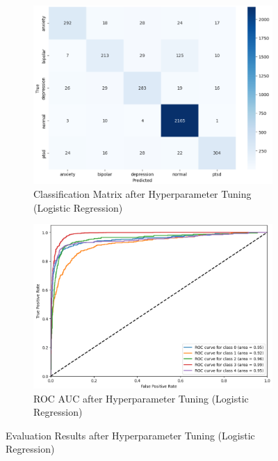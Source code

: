 \begin{figure}[h!]
    \centering
    \begin{subfigure}[b]{0.49\textwidth}
        \centering
        \includegraphics[width=\textwidth]{Images/HP LR CM.png}
        \caption{Classification Matrix after Hyperparameter Tuning (Logistic Regression)}
        \label{LSTMROC2}  %
    \end{subfigure}
    \hfill
    \begin{subfigure}[b]{0.49\textwidth}
        \centering
        \includegraphics[width=\textwidth]{Images/HP LR ROC.png}
        \caption{ROC AUC after Hyperparameter Tuning (Logistic Regression)}
        \label{LSTMROC3}  %
    \end{subfigure}
    \caption{Evaluation Results after Hyperparameter Tuning (Logistic Regression)}
    \label{fig:hp_lr_comparison}
\end{figure}

